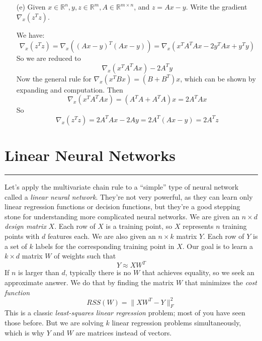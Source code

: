 \documentclass{article}
\begin{document}
\begin{itemize}
    \item [(e)] Given $x \in \mathbb{R}^{n}, y, z \in \mathbb{R}^{m}, A \in \mathbb{R}^{m \times n}$, and $z = Ax - y$. Write the gradient $\nabla_{x}(z^{T}z)$.
        \begin{answer}
            We have:
                \begin{equation*}
                    \nabla_{x}(z^{T}z) = \nabla_{x}((Ax - y)^{T}(Ax - y)) = \nabla_{x}(x^{T}A^{T}Ax - 2y^{T}Ax + y^{T}y)
                \end{equation*}
            So we are reduced to 
                \begin{equation*}
                    \nabla_{x}(x^{T}A^{T}Ax) - 2A^{T}y
                \end{equation*}
            Now the general rule for $\nabla_{x}(x^{T}Bx) = (B + B^{T})x$, which can be shown by expanding and computation. Then
                \begin{equation*}
                    \nabla_{x}(x^{T}A^{T}Ax) = (A^{T}A + A^{T}A)x = 2A^{T}Ax
                \end{equation*}
            So
                \begin{equation*}
                    \nabla_{x}(z^{T}z) = 2A^{T}Ax - 2Ay = 2A^{T}(Ax - y) = 2A^{T}z
                \end{equation*} 
        \end{answer}
\end{itemize}

\newpage
\section*{Linear Neural Networks}
\hrule

Let's apply the multivariate chain rule to a ``simple'' type of neural network called a \textit{linear neural network}. They're not very powerful, as they can learn only linear regression functions or decision functions, but they're a good stepping stone for understanding more complicated neural networks. We are given an $n \times d$ \textit{design matrix} $X$. Each row of $X$ is a training point, so $X$ represents $n$ training points with $d$ features each. We are also given an $n \times k$ matrix $Y$. Each row of $Y$ is a set of $k$ labels for the corresponding training point in $X$. Our goal is to learn a $k \times d$ matrix $W$ of weights such that
    \begin{equation*}
        Y \approx XW^{T}
    \end{equation*}
If $n$ is larger than $d$, typically there is no $W$ that achieves equality, so we seek an approximate answer. We do that by finding the matrix $W$ that minimizes the \textit{cost function}
    \begin{equation*}
        RSS(W) = \lVert XW^{T} - Y \rVert^{2}_{F}
    \end{equation*}
This is a classic \textit{least-squares linear regression} problem; most of you have seen those before. But we are solving $k$ linear regression problems simultaneously, which is why $Y$ and $W$ are matrices instead of vectors.
\end{document}
